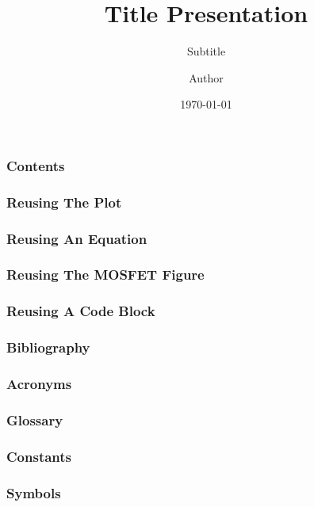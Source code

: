 \documentclass{beamer}
\title{Title Presentation}
\subtitle{Subtitle}
\author{Author}
\date{\today}
\begin{document}
    \begin{frame}
        \titlepage
    \end{frame}
    \begin{frame}
        \frametitle{Contents}
        \tableofcontents
    \end{frame}
    \begin{frame}
        \frametitle{Reusing The Plot}
    \end{frame}
    \begin{frame}
        \frametitle{Reusing An Equation}
    \end{frame}
    \begin{frame}
        \frametitle{Reusing The MOSFET Figure}
    \end{frame}
    \begin{frame}[fragile]
        \frametitle{Reusing A Code Block}
    \end{frame}
    \begin{frame}[allowframebreaks]
        \frametitle{Bibliography}
        \printbibliography
    \end{frame}
    \begin{frame}[allowframebreaks]
        \frametitle{Acronyms}
        \printglossary[type=\acronymtype]
    \end{frame}
    \begin{frame}[allowframebreaks]
        \frametitle{Glossary}
        \printglossary[type=main]
    \end{frame}
    \begin{frame}[allowframebreaks]
        \frametitle{Constants}
        \printglossary[type=constants, nonumberlist, nopostdot]
    \end{frame}
    \begin{frame}[allowframebreaks]
        \frametitle{Symbols}
        \printglossary[type=symbols]
    \end{frame}
\end{document}
